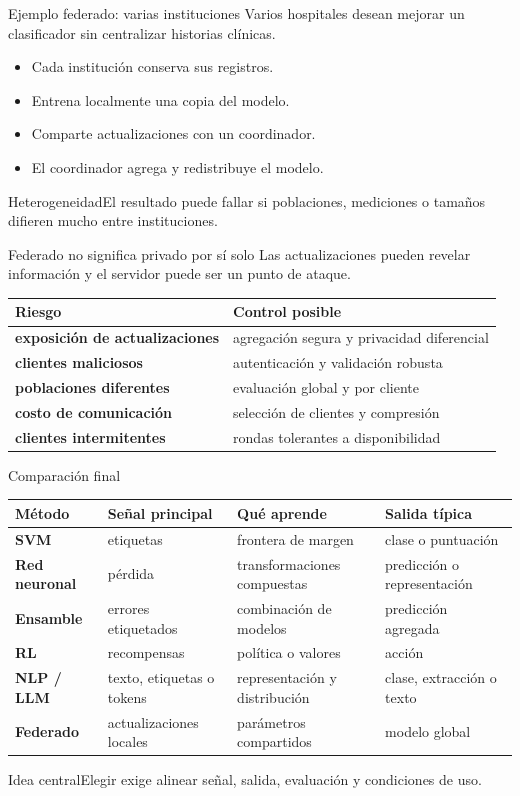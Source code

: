 \documentclass[aspectratio=169,10pt]{beamer}
\newcommand{\idea}[1]{\begin{block}{Idea central}#1\end{block}}
\begin{document}
\begin{frame}{Ejemplo federado: varias instituciones}
  \small
  Varios hospitales desean mejorar un clasificador sin centralizar historias clínicas.
  \begin{itemize}
    \item Cada institución conserva sus registros.
    \item Entrena localmente una copia del modelo.
    \item Comparte actualizaciones con un coordinador.
    \item El coordinador agrega y redistribuye el modelo.
  \end{itemize}
  \begin{alertblock}{Heterogeneidad}El resultado puede fallar si poblaciones, mediciones o tamaños difieren mucho entre instituciones.\end{alertblock}
\end{frame}

\begin{frame}{Federado no significa privado por sí solo}
  \small
  Las actualizaciones pueden revelar información y el servidor puede ser un punto de ataque.
  \begin{tabularx}{\textwidth}{>{\bfseries}p{}X}\toprule
  Riesgo & Control posible\\\midrule
  exposición de actualizaciones & agregación segura y privacidad diferencial\\
  clientes maliciosos & autenticación y validación robusta\\
  poblaciones diferentes & evaluación global y por cliente\\
  costo de comunicación & selección de clientes y compresión\\
  clientes intermitentes & rondas tolerantes a disponibilidad\\\bottomrule
  \end{tabularx}
\end{frame}

\begin{frame}{Comparación final}
  \scriptsize
  \begin{tabularx}{\textwidth}{>{\bfseries}p{}p{}p{}X}\toprule
  Método & Señal principal & Qué aprende & Salida típica\\\midrule
  SVM & etiquetas & frontera de margen & clase o puntuación\\
  Red neuronal & pérdida & transformaciones compuestas & predicción o representación\\
  Ensamble & errores etiquetados & combinación de modelos & predicción agregada\\
  RL & recompensas & política o valores & acción\\
  NLP / LLM & texto, etiquetas o tokens & representación y distribución & clase, extracción o texto\\
  Federado & actualizaciones locales & parámetros compartidos & modelo global\\\bottomrule
  \end{tabularx}
  \idea{Elegir exige alinear señal, salida, evaluación y condiciones de uso.}
\end{frame}
\end{document}

